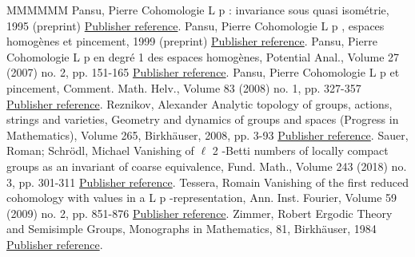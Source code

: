 \begin{thebibliography}{MMMMMM}
 Pansu, Pierre Cohomologie L p  : invariance sous quasi isométrie, 1995 (preprint) \href{https://ahl.centre-mersenne.org/item/AHL_2020__3__1291_0/#Pa95}{Publisher reference}.
 Pansu, Pierre Cohomologie L p , espaces homogènes et pincement, 1999 (preprint) \href{https://ahl.centre-mersenne.org/item/AHL_2020__3__1291_0/#Pa99}{Publisher reference}.
 Pansu, Pierre Cohomologie L p  en degré 1 des espaces homogènes, Potential Anal., Volume 27 (2007) no. 2, pp. 151-165 \href{https://ahl.centre-mersenne.org/item/AHL_2020__3__1291_0/#P2}{Publisher reference}.
 Pansu, Pierre Cohomologie L p  et pincement, Comment. Math. Helv., Volume 83 (2008) no. 1, pp. 327-357 \href{https://ahl.centre-mersenne.org/item/AHL_2020__3__1291_0/#P1}{Publisher reference}.
 Reznikov, Alexander Analytic topology of groups, actions, strings and varieties, Geometry and dynamics of groups and spaces (Progress in Mathematics), Volume 265, Birkhäuser, 2008, pp. 3-93 \href{https://ahl.centre-mersenne.org/item/AHL_2020__3__1291_0/#Rez}{Publisher reference}.
 Sauer, Roman; Schrödl, Michael Vanishing of \(\ell\) 2 -Betti numbers of locally compact groups as an invariant of coarse equivalence, Fund. Math., Volume 243 (2018) no. 3, pp. 301-311 \href{https://ahl.centre-mersenne.org/item/AHL_2020__3__1291_0/#SaSc}{Publisher reference}.
 Tessera, Romain Vanishing of the first reduced cohomology with values in a L p -representation, Ann. Inst. Fourier, Volume 59 (2009) no. 2, pp. 851-876 \href{https://ahl.centre-mersenne.org/item/AHL_2020__3__1291_0/#T}{Publisher reference}.
 Zimmer, Robert Ergodic Theory and Semisimple Groups, Monographs in Mathematics, 81, Birkhäuser, 1984 \href{https://ahl.centre-mersenne.org/item/AHL_2020__3__1291_0/#Z}{Publisher reference}.
\end{thebibliography}
